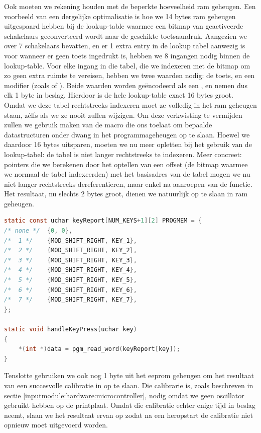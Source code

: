 Ook moeten we rekening houden met de beperkte hoeveelheid \ac{ram} geheugen. Een voorbeeld van een dergelijke optimalisatie is hoe we 14 bytes \ac{ram} geheugen uitgespaard hebben bij de lookup-table waarmee een bitmap van geactiveerde schakelaars geconverteerd wordt naar de geschikte toetsaandruk. Aangezien we over 7 schakelaars bevatten, en er 1 extra entry in de lookup tabel aanwezig is voor wanneer er geen toets ingedrukt is, hebben we 8 ingangen nodig binnen de lookup-table. Voor elke ingang in die tabel, die we indexeren met de bitmap om zo geen extra ruimte te vereisen, hebben we twee waarden nodig: de toets, en een modifier (zoals  of ). Beide waarden worden geëncodeerd als een , en nemen dus elk 1 byte in beslag. Hierdoor is de hele lookup-table exact 16 bytes groot. Omdat we deze tabel rechtstreeks indexeren moet ze volledig in het \ac{ram} geheugen staan, zélfs als we ze nooit zullen wijzigen. Om deze verkwisting te vermijden zullen we gebruik maken van de  macro die ons toelaat om bepaalde datastructuren onder dwang in het programmageheugen op te slaan. Hoewel we daardoor 16 bytes uitsparen, moeten we nu meer opletten bij het gebruik van de lookup-tabel: de tabel is niet langer rechtstreeks te indexeren. Meer concreet: pointers die we berekenen door het optellen van een offset (de bitmap waarmee we normaal de tabel indexeerden) met het basisadres van de tabel mogen we nu niet langer rechtstreeks dereferentieren, maar enkel na aanroepen van de  functie. Het resultaat, nu slechts 2 bytes groot, dienen we natuurlijk op te slaan in \ac{ram} geheugen.

\begin{lstlisting}[language=C, float, caption=Optimalisatie van de lookup-table.]
static const uchar keyReport[NUM_KEYS+1][2] PROGMEM = {
/* none */  {0, 0},
/*  1 */    {MOD_SHIFT_RIGHT, KEY_1},
/*  2 */    {MOD_SHIFT_RIGHT, KEY_2},
/*  3 */    {MOD_SHIFT_RIGHT, KEY_3},
/*  4 */    {MOD_SHIFT_RIGHT, KEY_4},
/*  5 */    {MOD_SHIFT_RIGHT, KEY_5},
/*  6 */    {MOD_SHIFT_RIGHT, KEY_6},
/*  7 */    {MOD_SHIFT_RIGHT, KEY_7},
};

static void handleKeyPress(uchar key)
{
    *(int *)data = pgm_read_word(keyReport[key]);
}
\end{lstlisting}

Tenslotte gebruiken we ook nog 1 byte uit het \ac{eeprom} geheugen om het resultaat van een succesvolle calibratie in op te slaan. Die calibrarie is, zoals beschreven in sectie \ref{inputmodule:hardware:microcontroller}, nodig omdat we geen oscillator gebruikt hebben op de printplaat. Omdat die calibratie echter enige tijd in beslag neemt, slaan we het resultaat ervan op zodat na een heropstart de calibratie niet opnieuw moet uitgevoerd worden.

